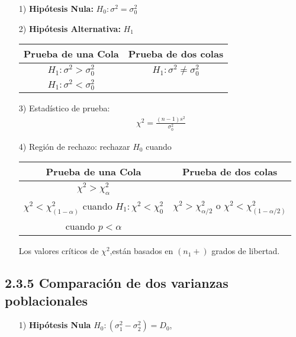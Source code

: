 \begin{frame}
\begin{frame}
\begin{itemize}
\item[1) ] \textbf{Hip\'otesis Nula:} $H_{0}:\sigma^{2}=\sigma^{2}_{0}$
\item[2) ] \textbf{Hip\'otesis Alternativa: } $H_{1}$
\begin{tabular}{cc}\hline
\textbf{Prueba de una Cola} & \textbf{Prueba de dos colas}\\\hline
$H_{1}:\sigma^{2}>\sigma^{2}_{0}$ & $H_{1}:\sigma^{2}\neq \sigma^{2}_{0}$\\ 
$H_{1}:\sigma^{2}<\sigma^{2}_{0}$&\\
\end{tabular}
\item[3) ] Estad\'istico de prueba:
\begin{eqnarray*}
\chi^{2}=\frac{\left(n-1\right)s^{2}}{\sigma^{2}_{0}}
\end{eqnarray*}

\end{itemize}






\begin{itemize}
\item[4) ] Regi\'on de rechazo: rechazar $H_{0}$ cuando
\begin{tabular}{cc}\hline
\textbf{Prueba de una Cola} & \textbf{Prueba de dos colas}\\\hline
$\chi^{2}>\chi^{2}_{\alpha}$ & \\
$\chi^{2}<\chi^{2}_{\left(1-\alpha\right)}$ cuando $H_{1}:\chi^{2}<\chi^{2}_{0}$&$\chi^{2}>\chi^{2}_{\alpha/2}$ o $\chi^{2}<\chi^{2}_{\left(1-\alpha/2\right)}$\\
 cuando $p<\alpha$&\\
\end{tabular}

Los valores cr\'iticos de $\chi^{2}$,est\'an basados en $\left(n_{1}+\right)$ grados de libertad.

\end{itemize}





\subsection{2.3.5 Comparaci\'on de dos varianzas poblacionales}





\begin{itemize}
\item[1) ] \textbf{Hip\'otesis Nula} $H_{0}:\left(\sigma^{2}_{1}-\sigma^{2}_{2}\right)=D_{0}$,\medskip


\end{itemize}
\end{frame}
\end{frame}
